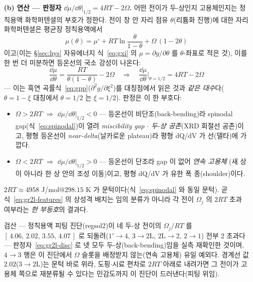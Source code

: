 \textbf{(b) 연산 --- 판정자 $\dd\mu/\dd\theta|_{1/2}=4RT-2\Omega$.} 어떤 전이가 두-상인지 고용체인지는
정칙용액 화학퍼텐셜의 부호가 정한다. 전이 창 안 자리 점유 $\theta$(리튬화 진행)에 대한 자리 화학퍼텐셜은
평균장 정칙용액에서
\begin{equation}
\mu(\theta)=\mu^\circ+RT\ln\frac{\theta}{1-\theta}+\Omega\,(1-2\theta)
\label{eq:gr2l-mu}
\end{equation}
이고(이는 \S\ref{sec:hys} 자유에너지 식~\eqref{eq:gxi} 의 $\mu=\partial g/\partial\theta$ 를 $\theta$-좌표로
적은 것), 이를 한 번 더 미분하면 등온선의 국소 강성이 나온다:
\begin{equation}
\frac{\dd\mu}{\dd\theta}=\frac{RT}{\theta(1-\theta)}-2\Omega
\quad\Longrightarrow\quad
\frac{\dd\mu}{\dd\theta}\Big|_{\theta=1/2}=4RT-2\Omega
\label{eq:gr2l-disc}
\end{equation}
--- 이는 흑연 곡률식~\eqref{eq:gpp}($\partial^2 g/\partial\xi^2$)를 대칭점에서 읽은 것과 \emph{같은 대수}다($\theta{=}1{-}\xi$
대칭에서 $\theta{=}1/2$ 는 $\xi{=}1/2$). 판정은 이 한 부호다:
\begin{itemize}[leftmargin=1.4em,itemsep=1pt]
\item $\Omega>2RT$ $\Rightarrow$ $\dd\mu/\dd\theta|_{1/2}<0$ --- 등온선이 비단조(back-bending)라 spinodal
gap(식~\eqref{eq:spinodal})이 열려 \emph{miscibility gap $\cdot$ 두-상 공존}(XRD 회절선 공존)이고, 평형 등온선이
\emph{near-delta}(날카로운 plateau)라 평형 dQ/dV 가 선(델타)에 가깝다.
\item $\Omega<2RT$ $\Rightarrow$ $\dd\mu/\dd\theta|_{1/2}>0$ --- 등온선이 단조라 gap 이 없어 \emph{연속 고용체}
(새 상이 아니라 한 상 안의 조성 이동)이고, 평형 dQ/dV 가 유한 폭 종(shoulder)이다.
\end{itemize}
$2RT{\approx}4958$ J/mol$@298.15$ K 가 문턱이다(식~\eqref{eq:spinodal} 와 동일 문턱). 곧 식~\eqref{eq:gr2l-features}
의 상성격 배치는 임의 분류가 아니라 각 전이 $\Omega_j$ 의 $2RT$ 초과 여부라는 \emph{한 부등호}의 결과다.

\begin{verifybox}
검산 --- 정칙용액 피팅 진단(regsol2)이 네 두-상 전이의 $\Omega_j/RT$ 를
$[\,4.06,\,2.02,\,3.55,\,4.07\,]$ 로 되돌려($1'\!\to\!4,\,3\!\to\!2\mathrm L,\,2\mathrm L\!\to\!2,\,2\!\to\!1$) 전부
$2$ 초과다 --- 판정자~\eqref{eq:gr2l-disc} 로 넷 모두 두-상(back-bending)임을 실측 재확인한 것이며, $4\!\to\!3$
행은 이 진단에서 $\Omega$ 슬롯을 배정받지 않는(연속 고용체) 유일 예외다. 경계선 값 $2.02$($3\!\to\!2\mathrm L$)는
문턱 바로 위라, 도핑$\cdot$시료 편차로 $2RT$ 아래로 내려가면 그 전이가 고용체 쪽으로 재분류될 수 있다는
민감도까지 이 진단이 드러낸다(피팅 위임).
\end{verifybox}

